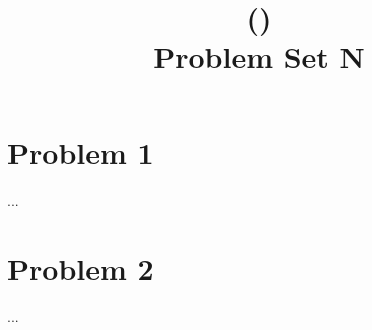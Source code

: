 \documentclass[11pt]{article}
\title{\coursename (\coursecode)\\Problem Set N}
\author{\studentname}
\date{\semester}
\begin{document}
\maketitle

\section*{Problem 1}

...

\section*{Problem 2}

...
\end{document}
